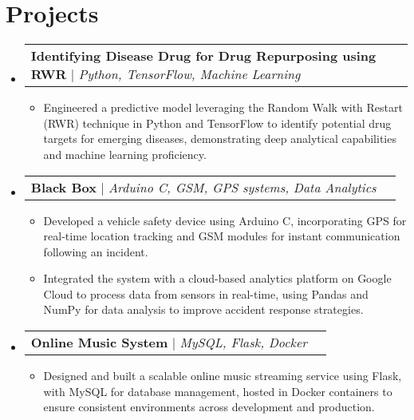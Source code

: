 \documentclass[letterpaper,10pt]{article}
\makeatletter
\newcommand{\subheadingtitlevspace}{
\vspace{-3pt}
}
\newcommand{\resumeItem}[1]{
  \item{
    {#1 \vspace{-4pt}}
  }
}
\newcommand{\titleItem}[1]{
  \textbf{#1}
}
\newcommand{\resumeProjectHeading}[2]{
    \item
    \begin{tabular*}{0.97\textwidth}{l@{\extracolsep{\fill}}r}
      #1 & \textit{ #2} \\
    \end{tabular*}\vspace{-9pt}
}
\newcommand{\resumeSubHeadingListStart}{\subheadingtitlevspace\begin{itemize}[leftmargin=0.15in, label={}]}
\newcommand{\resumeSubHeadingListEnd}{\end{itemize}}
\newcommand{\resumeItemListStart}{
\begin{itemize}}
\newcommand{\resumeItemListEnd}{
\end{itemize}\vspace{-8pt}}
\makeatother
\begin{document}

 \section{Projects}    
\resumeSubHeadingListStart
    \resumeProjectHeading
    {\titleItem{Identifying Disease Drug for Drug Repurposing using RWR} $|$ \emph{Python, TensorFlow, Machine Learning}}{}
    \resumeItemListStart
    \resumeItem{Engineered a predictive model leveraging the Random Walk with Restart (RWR) technique in Python and TensorFlow to identify potential drug targets for emerging diseases, demonstrating deep analytical capabilities and machine learning proficiency.}
    \resumeItemListEnd
    \resumeProjectHeading
        {\titleItem{Black Box} $|$ \emph{Arduino C, GSM, GPS systems, Data Analytics}}{}
        \resumeItemListStart
        \resumeItem{Developed a vehicle safety device using Arduino C, incorporating GPS for real-time location tracking and GSM modules for instant communication following an incident.}
        \resumeItem{Integrated the system with a cloud-based analytics platform on Google Cloud to process data from sensors in real-time, using Pandas and NumPy for data analysis to improve accident response strategies.}
        \resumeItemListEnd
    \resumeProjectHeading
        {\titleItem{Online Music System} $|$ \emph{MySQL, Flask, Docker}}{}
        \resumeItemListStart
        \resumeItem{Designed and built a scalable online music streaming service using Flask, with MySQL for database management, hosted in Docker containers to ensure consistent environments across development and production.}
        \resumeItemListEnd
\resumeSubHeadingListEnd
\end{document}
